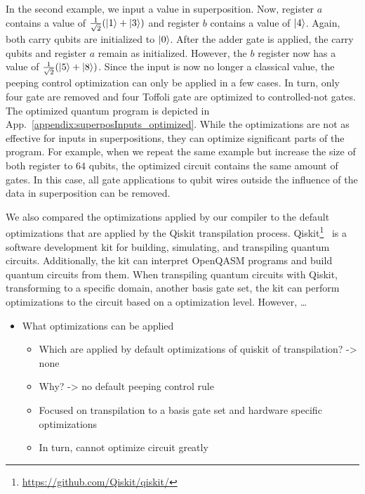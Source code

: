In the second example, we input a value in superposition. Now, register $a$ contains a value of $\frac{1}{\sqrt{2}} (\ket{1} + \ket{3})$ and register $b$ contains a value of $\ket{4}$. Again, both carry qubits are initialized to $\ket{0}$. After the adder gate is applied, the carry qubits and register $a$ remain as initialized. However, the $b$ register now has a value of $\frac{1}{\sqrt{2}} (\ket{5} + \ket{8})$.
Since the input is now no longer a classical value, the peeping control optimization can only be applied in a few cases. In turn, only four gate are removed and four Toffoli gate are optimized to controlled-not gates.
The optimized quantum program is depicted in App.~\ref{appendix:superposInputs_optimized}. While the optimizations are not as effective for inputs in superpositions, they can optimize significant parts of the program. For example, when we repeat the same example but increase the size of both register to $64$ qubits, the optimized circuit contains the same amount of gates. In this case, all gate applications to qubit wires outside the influence of the data in superposition can be removed.

We also compared the optimizations applied by our compiler to the default optimizations that are applied by the Qiskit transpilation process. Qiskit\footnote{\url{https://github.com/Qiskit/qiskit/}}~\cite{JTK*24} is a software development kit for building, simulating, and transpiling quantum circuits. Additionally, the kit can interpret OpenQASM programs and build quantum circuits from them. When transpiling quantum circuits with Qiskit, \ie transforming to a specific domain, \eg another basis gate set, the kit can perform optimizations to the circuit based on a optimization level. However, \dots
\begin{itemize}
    \item What optimizations can be applied
    \begin{itemize}
        \item Which are applied by default optimizations of quiskit of transpilation? -> none
        \item Why? -> no default peeping control rule
        \item Focused on transpilation to a basis gate set and hardware specific optimizations 
        \item In turn, cannot optimize circuit greatly
    \end{itemize}
\end{itemize}


